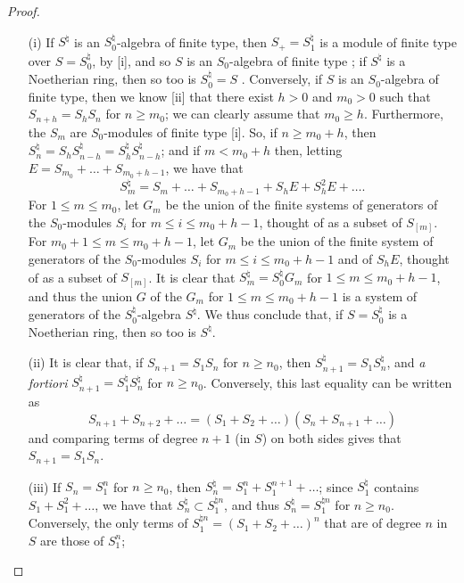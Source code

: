 \begin{proof}
\begin{enumerate}
  \item[\rm{(i)}] If $S^\natural$ is an $S_0^\natural$-algebra of finite type, then $S_+=S_1^\natural$ is a module of finite type over $S=S_0^\natural$, by [i], and so $S$ is an $S_0$-algebra of finite type ;
    if $S^\natural$ is a Noetherian ring, then so too is $S_0^\natural=S$ .
    Conversely, if $S$ is an $S_0$-algebra
    of finite type, then we know [ii] that there exist $h>0$ and $m_0>0$ such that $S_{n+h}=S_hS_n$ for $n\geq m_0$;
    we can clearly assume that $m_0\geq h$.
    Furthermore, the $S_m$ are $S_0$-modules of finite type [i].
    So, if $n\geq m_0+h$, then $S_n^\natural = S_hS_{n-h}^\natural = S_h^\natural S_{n-h}^\natural$;
    and if $m<m_0+h$ then, letting $E = S_{m_0}+\ldots+S_{m_0+h-1}$, we have that
    \[
      S_m^\natural = S_m + \ldots + S_{m_0+h-1} + S_hE + S_h^2E + \ldots.
    \]
    For $1\leq m\leq m_0$, let $G_m$ be the union of the finite systems of generators of the $S_0$-modules $S_i$ for $m\leq i\leq m_0+h-1$, thought of as a subset of $S_{[m]}$.
    For $m_0+1\leq m\leq m_0+h-1$, let $G_m$ be the union of the finite system of generators of the $S_0$-modules $S_i$ for $m\leq i\leq m_0+h-1$ and of $S_hE$, thought of as a subset of $S_{[m]}$.
    It is clear that $S_m^\natural=S_0^\natural G_m$ for $1\leq m\leq m_0+h-1$, and thus the union $G$ of the $G_m$ for $1\leq m\leq m_0+h-1$ is a system of generators of the $S_0^\natural$-algebra $S^\natural$.
    We thus conclude that, if $S=S_0^\natural$ is a Noetherian ring, then so too is $S^\natural$.
  \item[\rm{(ii)}] It is clear that, if $S_{n+1}=S_1S_n$ for $n\geq n_0$, then $S_{n+1}^\natural=S_1S_n^\natural$, and \emph{a fortiori} $S_{n+1}^\natural=S_1^\natural S_n^\natural$ for $n\geq n_0$.
    Conversely, this last equality can be written as
    \[
      S_{n+1} + S_{n+2} + \ldots
      =
      (S_1 + S_2 + \ldots)(S_n + S_{n+1} + \ldots)
    \]
    and comparing terms of degree $n+1$ (in $S$) on both sides gives that $S_{n+1}=S_1S_n$.
  \item[\rm{(iii)}] If $S_n=S_1^n$ for $n\geq n_0$, then $S_n^\natural=S_1^n+S_1^{n+1}+\ldots$;
    since $S_1^\natural$ contains $S_1+S_1^2+\ldots$, we have that $S_n^\natural\subset S_1^{\natural n}$, and thus $S_n^\natural=S_1^{\natural n}$ for $n\geq n_0$.
    Conversely, the only terms of $S_1^{\natural n}=(S_1+S_2+\ldots)^n$ that are of degree $n$ in $S$ are those of $S_1^n$;

\end{enumerate}
\end{proof}
